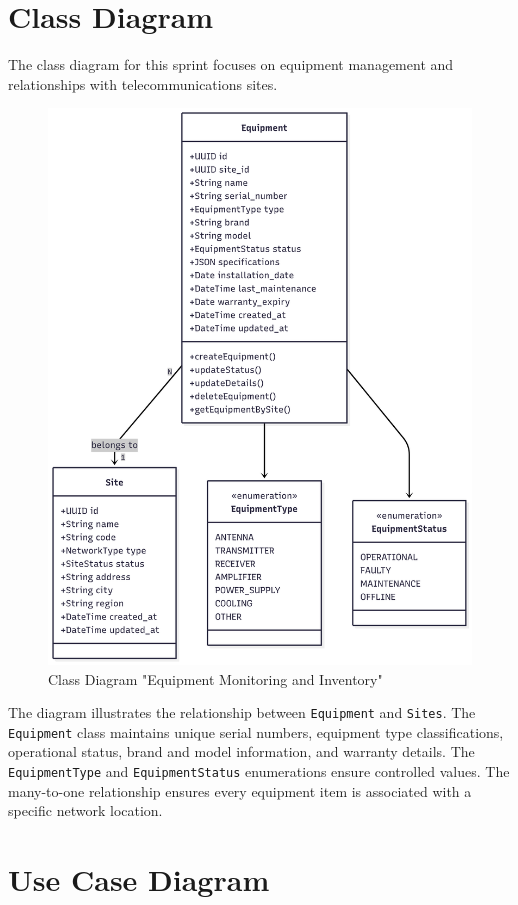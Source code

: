 \section{Class Diagram}

The class diagram for this sprint focuses on equipment management and relationships with telecommunications sites.

\begin{figure}[H]
    \centering
    \includegraphics[width=0.8\linewidth]{img/chap_04/equipment_class_diagram.png}
    \caption{Class Diagram "Equipment Monitoring and Inventory"}
    \label{fig:class_diagram_sprint2}
\end{figure}

The diagram illustrates the relationship between \texttt{Equipment} and \texttt{Sites}. The \texttt{Equipment} class maintains unique serial numbers, equipment type classifications, operational status, brand and model information, and warranty details. The \texttt{EquipmentType} and \texttt{EquipmentStatus} enumerations ensure controlled values. The many-to-one relationship ensures every equipment item is associated with a specific network location.

\section{Use Case Diagram}

